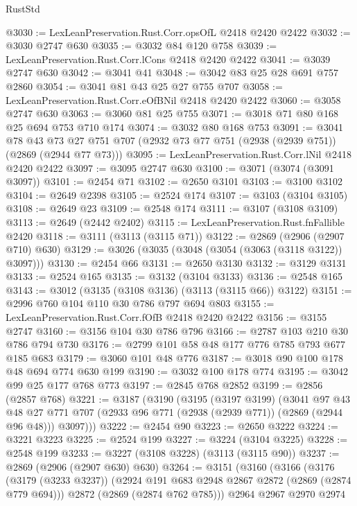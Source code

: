 \begin{lexlean}{RustStd}
\begin{coremodule}
{\begin{coremodule}
{{{{{{{{{{{{@3030 := LexLeanPreservation.Rust.Corr.opsOfL @2418 @2420 @2422
@3032 := @3030 @2747 @630
@3035 := @3032 @84 @120 @758
@3039 := LexLeanPreservation.Rust.Corr.lCons @2418 @2420 @2422
@3041 := @3039 @2747 @630
@3042 := @3041 @41
@3048 := @3042 @83 @25 @28 @691 @757 @2860
@3054 := @3041 @81 @43 @25 @27 @755 @707
@3058 := LexLeanPreservation.Rust.Corr.eOfBNil @2418 @2420 @2422
@3060 := @3058 @2747 @630
@3063 := @3060 @81 @25 @755
@3071 := @3018 @71 @80 @168 @25 @694 @753 @710 @174
@3074 := @3032 @80 @168 @753
@3091 := @3041
    @78
    @43
    @73
    @27
    @751
    @707
    (@2932 @73 @77 @751 (@2938 (@2939 @751)) (@2869 (@2944 @77 @73)))
@3095 := LexLeanPreservation.Rust.Corr.lNil @2418 @2420 @2422
@3097 := @3095 @2747 @630
@3100 := @3071 (@3074 (@3091 @3097))
@3101 := @2454 @71
@3102 := @2650 @3101
@3103 := @3100 @3102
@3104 := @2649 @2398
@3105 := @2524 @174
@3107 := @3103 (@3104 @3105)
@3108 := @2649 @23
@3109 := @2548 @174
@3111 := @3107 (@3108 @3109)
@3113 := @2649 (@2442 @2402)
@3115 := LexLeanPreservation.Rust.fnFallible @2420
@3118 := @3111 (@3113 (@3115 @71))
@3122 := @2869 (@2906 (@2907 @710) @630)
@3129 := @3026 (@3035 (@3048 (@3054 (@3063 (@3118 @3122)) @3097)))
@3130 := @2454 @66
@3131 := @2650 @3130
@3132 := @3129 @3131
@3133 := @2524 @165
@3135 := @3132 (@3104 @3133)
@3136 := @2548 @165
@3143 := @3012 (@3135 (@3108 @3136) (@3113 (@3115 @66)) @3122)
@3151 := @2996 @760 @104 @110 @30 @786 @797 @694 @803
@3155 := LexLeanPreservation.Rust.Corr.fOfB @2418 @2420 @2422
@3156 := @3155 @2747
@3160 := @3156 @104 @30 @786 @796
@3166 := @2787 @103 @210 @30 @786 @794 @730
@3176 := @2799 @101 @58 @48 @177 @776 @785 @793 @677 @185 @683
@3179 := @3060 @101 @48 @776
@3187 := @3018 @90 @100 @178 @48 @694 @774 @630 @199
@3190 := @3032 @100 @178 @774
@3195 := @3042 @99 @25 @177 @768 @773
@3197 := @2845 @768 @2852
@3199 := @2856 (@2857 @768)
@3221 := @3187
    (@3190
      (@3195
        (@3197 @3199)
        (@3041
          @97
          @43
          @48
          @27
          @771
          @707
          (@2933 @96 @771 (@2938 (@2939 @771)) (@2869 (@2944 @96 @48)))
          @3097)))
@3222 := @2454 @90
@3223 := @2650 @3222
@3224 := @3221 @3223
@3225 := @2524 @199
@3227 := @3224 (@3104 @3225)
@3228 := @2548 @199
@3233 := @3227 (@3108 @3228) (@3113 (@3115 @90))
@3237 := @2869 (@2906 (@2907 @630) @630)
@3264 := @3151
    (@3160
      (@3166
        (@3176
          (@3179 (@3233 @3237))
          (@2924 @191 @683 @2948 @2867 @2872 (@2869 (@2874 @779 @694)))
          @2872
          (@2869 (@2874 @762 @785)))
        @2964
        @2967
        @2970
        @2974
}}}}}}}}}}}}
\end{coremodule}}
\end{coremodule}
\end{lexlean}
